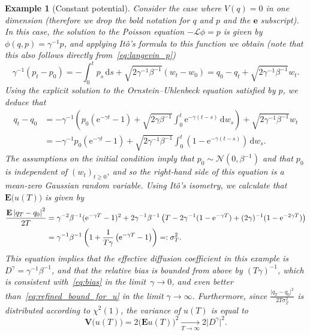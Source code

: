 \documentclass[11pt,a4paper]{article}
\newcommand{\e}{\mathrm{e}}
\newcommand{\expect}[0]{\mathbf{E}}
\newcommand{\var}[0]{\mathbf{V}}
\newcommand{\vect}[1]{\boldsymbol{\mathbf #1}}
\renewcommand{\d}{\mathrm d}
\theoremstyle{plain}
\newtheorem{example}{Example}[section]
\numberwithin{equation}{section}
\renewcommand{\geq}{\geqslant}
\begin{document}
\begin{example}
    [Constant potential]
    \label{example:constant}
    Consider the case where $V(q) = 0$ in one dimension
    (therefore we drop the bold notation for $q$ and $p$ and the $\vect e$ subscript).
    In this case, the solution to the Poisson equation $- \mathcal L \phi = p$ is given by $\phi(q, p) = \gamma^{-1} p$,
    and applying Itô's formula to this function we obtain
    (note that this also follows directly from~\eqref{eq:langevin_p})
    \[
        \gamma^{-1}(p_t - p_0) = - \int_{0}^{t} p_s \, \d s + \sqrt{2 \gamma^{-1} \beta^{-1}} (w_t - w_0)
        = q_0 - q_t + \sqrt{2 \gamma^{-1} \beta^{-1}} w_t.
    \]
    Using the explicit solution to the Ornstein--Uhlenbeck equation satisfied by $p$,
    we deduce that
    \begin{align*}
        q_t - q_0
        &= - \gamma^{-1} \left( p_0 \left(\e^{-\gamma t} - 1\right) + \sqrt{2 \gamma \beta^{-1}}\int_{0}^{t} \e^{-\gamma (t - s)} \, \d w_s \right)
        + \sqrt{2 \gamma^{-1} \beta^{-1}} w_t \\
        &=  - \gamma^{-1} p_0 \left(\e^{-\gamma t} - 1\right) + \sqrt{2 \gamma^{-1} \beta^{-1}}\int_{0}^{t} \left(1 - \e^{-\gamma (t - s)}\right) \, \d w_s.
    \end{align*}
    The assumptions on the initial condition imply that $p_0 \sim \mathcal N(0, \beta^{-1})$ and that $p_0$ is independent of $(w_t)_{t \geq 0}$,
    and so the right-hand side of this equation is a mean-zero Gaussian random variable.
    Using It\^o's isometry, we calculate that $\expect \bigl( u(T) \bigr)$ is given by
    \begin{align*}
        \frac{\expect \abs{q_T - q_0}^2}{2T}
        &= \gamma^{-2} \beta^{-1} (\e^{-\gamma T} - 1)^2
        + 2 \gamma^{-1} \beta^{-1} \left(T - 2 \gamma^{-1} (1 - \e^{-\gamma T}) + (2 \gamma)^{-1} (1 - \e^{-2 \gamma T})\right) \\
        &= \gamma^{-1} \beta^{-1} \left( 1 + \frac{1}{T \gamma} \left(\e^{-\gamma T} - 1\right) \right) =: \sigma_T^2.
    \end{align*}
    This equation implies that the effective diffusion coefficient in this example is $D^{\gamma} = \gamma^{-1} \beta^{-1}$,
    and that the relative bias is bounded from above by $(T \gamma)^{-1}$,
    which is consistent with~\eqref{eq:bias} in the limit~$\gamma \to 0$,
    and even better than~\eqref{eq:refined_bound_for_u} in the limit $\gamma \to \infty$.
    Furthermore,
    since $\frac{\lvert q_T- q_0 \rvert^2}{2T\sigma_T^2}$ is distributed according to $\chi^2(1)$,
    the variance of $u(T)$ is equal to
    \[
        \var \bigl(u(T)\bigr) = 2  \bigl(\expect u(T)\bigr)^2
        \xrightarrow[T \to \infty]{} 2 \lvert D^{\gamma} \rvert^2.
    \]
\end{example}
\end{document}

